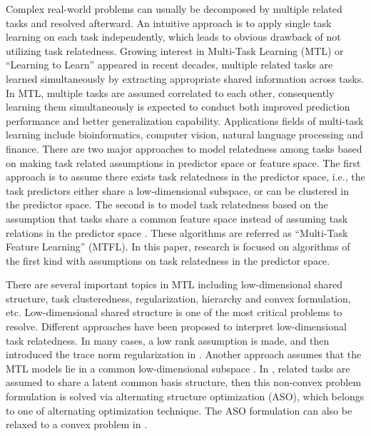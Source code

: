 \documentclass{article}
\newcounter{thm_counter}
\newcounter{lem_counter}
\newcounter{pro_counter}
\newcounter{ass_counter}
\begin{document}
Complex real-world problems can usually be decomposed by multiple related tasks and resolved afterward.
An intuitive approach is to apply single task learning on each task independently,
which leads to obvious drawback of not utilizing task relatedness.
Growing interest in Multi-Task
Learning (MTL) or ``Learning to Learn'' appeared in recent decades, multiple
related tasks are learned simultaneously by extracting appropriate shared information
across tasks. In MTL, multiple tasks are assumed correlated to
each other, consequently learning them simultaneously is expected to
conduct both improved prediction performance and better generalization
capability. Applications fields of multi-task learning include bioinformatics,
computer vision, natural language processing and finance. There are
two major approaches to model relatedness among tasks based on making
task related assumptions in predictor space or feature space.
The first approach is to assume there exists task relatedness in the predictor
space, i.e., the task predictors either share a low-dimensional subspace,
or can be clustered in the predictor space. The second is to model task
relatedness based on the assumption that tasks share a common feature
space instead of assuming task relations in the predictor space \cite{mtl:aso:ando2005framework,mtl:mlj2008:argyriou2008convex}.
These algorithms are referred as ``Multi-Task Feature Learning''
(MTFL). In this paper, research is focused on algorithms of the first kind with assumptions 
on task relatedness in the predictor space. 

There are several important topics in MTL including low-dimensional
shared structure, task clusteredness, regularization, hierarchy and convex formulation, etc. Low-dimensional
shared structure is one of the most critical problems to resolve. Different approaches have been proposed to interpret low-dimensional
task relatedness. In many cases, a low rank assumption is made, and then introduced the trace norm regularization in \cite{ji2009accelerated,mtl:siam2010:pong2010trace}. Another
approach assumes that the MTL models lie in a common low-dimensional
subspace \cite{mtl:icml2009:chen2009convex,mtl:NIPS2012:zhang,mtl:aso:ando2005framework}.
In \cite{mtl:aso:ando2005framework}, related tasks are assumed
to share a latent common basis structure, then this non-convex problem
formulation is solved via alternating structure optimization (ASO),
which belongs to one of alternating optimization technique.
The ASO formulation can also be relaxed to a convex problem in \cite{mtl:icml2009:chen2009convex}. 
\end{document}
